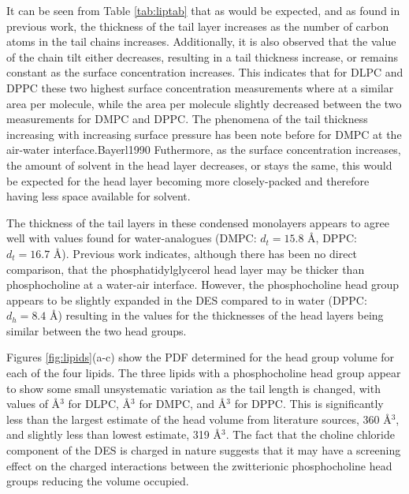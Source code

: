 \documentclass[twoside,twocolumn,9pt]{article}
\begin{document}
It can be seen from Table \ref{tab:liptab} that as would be expected, and as found in previous work,\cite{Mohwald1990,Vaknin1991} the thickness of the tail layer increases as the number of carbon atoms in the tail chains increases. Additionally, it is also observed that the value of the chain tilt either decreases, resulting in a tail thickness increase, or remains constant as the surface concentration increases. This indicates that for DLPC and DPPC these two highest surface concentration measurements where at a similar area per molecule, while the area per molecule slightly decreased between the two measurements for DMPC and DPPC. The phenomena of the tail thickness increasing with increasing surface pressure has been note before for DMPC at the air-water interface.{Bayerl1990} Futhermore, as the surface concentration increases, the amount of solvent in the head layer decreases, or stays the same, this would be expected for the head layer becoming more closely-packed and therefore having less space available for solvent. 

The thickness of the tail layers in these condensed monolayers appears to agree well with values found for water-analogues (DMPC: $d_t=15.8$ \AA,\cite{Johnson1991} DPPC: $d_t=16.7$ \AA\cite{Helm1987}). Previous work indicates, although there has been no direct comparison, that the phosphatidylglycerol head layer may be thicker than phosphocholine at a water-air interface.\cite{Clifton2012,Johnson1991,Vaknin1991,Lawrie2000} However, the phosphocholine head group appears to be slightly expanded in the DES compared to in water (DPPC: $d_h=8.4$ \AA\cite{Helm1987}) resulting in the values for the thicknesses of the head layers being similar between the two head groups. 

Figures \ref{fig:lipids}(a-c) show the PDF determined for the head group volume for each of the four lipids. The three lipids with a phosphocholine head group appear to show some small unsystematic variation as the tail length is changed, with values of  \AA$^{3}$ for DLPC,  \AA$^{3}$ for DMPC, and  \AA$^{3}$ for DPPC. This is significantly less than the largest estimate of the head volume from literature sources, 360 \AA$^3$,\cite{Tardieu1973} and slightly less than lowest estimate, 319 \AA$^3$.\cite{Sun1994,Kucerka2004} The fact that the choline chloride component of the DES is charged in nature suggests that it may have a screening effect on the charged interactions between the zwitterionic phosphocholine head groups reducing the volume occupied.
\end{document}
